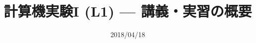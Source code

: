 \documentclass[dvipdfmx]{beamer}
\title{計算機実験I (L1) --- 講義・実習の概要}
\date{2018/04/18}
\begin{document}
\begin{frame}
  \titlepage
  \tableofcontents
\end{frame}





\end{document}
